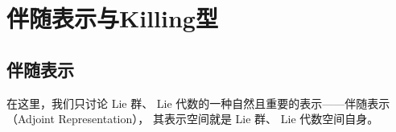 





\section{伴随表示与Killing型}
\subsection{伴随表示}\label{chlg:sec_adjoint}
在这里，我们只讨论 Lie 群、 Lie 代数的一种自然且重要的表示——伴随表示（Adjoint Representation），
其表示空间就是 Lie 群、 Lie 代数空间自身。

